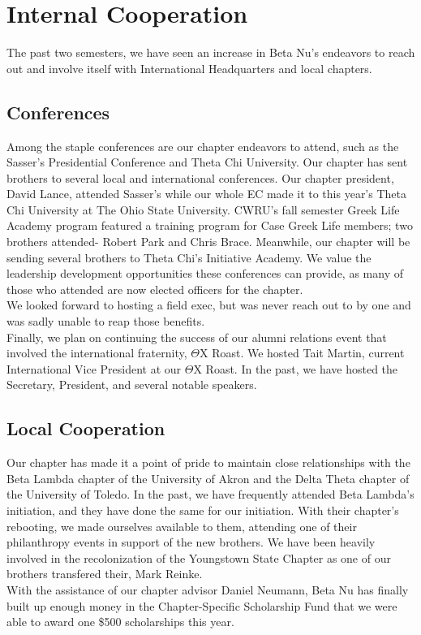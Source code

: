 \chapter{Internal Cooperation}
  The past two semesters, we have seen an increase in Beta Nu’s endeavors to reach out and involve itself with International Headquarters and local chapters. 
  
  \section*{Conferences}
  
    Among the staple conferences are our chapter endeavors to attend, such as the Sasser's Presidential Conference and Theta Chi University. Our chapter has sent brothers to several local and international conferences. Our chapter president, David Lance, attended Sasser's while our whole EC made it to this year's Theta Chi University at The Ohio State University. CWRU's fall semester Greek Life Academy program featured a training program for Case Greek Life members; two brothers attended- Robert Park and Chris Brace. Meanwhile, our chapter will be sending several brothers to Theta Chi's Initiative Academy. We value the leadership development opportunities these conferences can provide, as many of those who attended are now elected officers for the chapter. \\
    
    We looked forward to hosting a field exec, but was never reach out to by one and was sadly unable to reap those benefits.\\
    
    Finally, we plan on continuing the success of our alumni relations event that involved the international fraternity, $\Theta$X Roast. We hosted Tait Martin, current International Vice President at our $\Theta$X Roast. In the past, we have hosted the Secretary, President, and several notable speakers. 
    
  \section*{Local Cooperation}
    Our chapter has made it a point of pride to maintain close relationships with the Beta Lambda chapter of the University of Akron and the Delta Theta chapter of the University of Toledo. In the past, we have frequently attended Beta Lambda's initiation, and they have done the same for our initiation. With their chapter's rebooting, we made ourselves available to them, attending one of their philanthropy events in support of the new brothers. We have been heavily involved in the recolonization of the Youngstown State Chapter as one of our brothers transfered their, Mark Reinke.\\
    
    With the assistance of our chapter advisor Daniel Neumann, Beta Nu has finally built up enough money in the Chapter-Specific Scholarship Fund that we were able to award one \$500 scholarships this year.

 